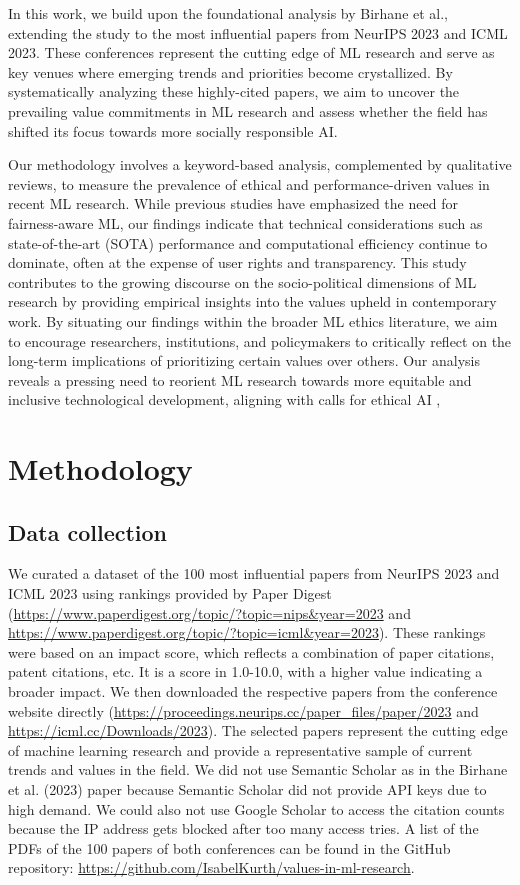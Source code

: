 \documentclass{article}
\begin{document}
In this work, we build upon the foundational analysis by Birhane et al., extending the study to the most influential papers from NeurIPS 2023 and ICML 2023. 
These conferences represent the cutting edge of ML research and serve as key venues where emerging trends and priorities become crystallized. By systematically analyzing these highly-cited papers, 
we aim to uncover the prevailing value commitments in ML research and assess whether the field has shifted its focus towards more socially responsible AI.

Our methodology involves a keyword-based analysis, complemented by qualitative reviews, to measure the prevalence of ethical and performance-driven values in recent ML research. While previous studies \cite{geyik2019fairness} 
have emphasized the need for fairness-aware ML, our findings indicate that technical considerations such as state-of-the-art (SOTA) performance and computational
efficiency continue to dominate, often at the expense of user rights and transparency.
This study contributes to the growing discourse on the socio-political dimensions of ML research by providing empirical insights into the values upheld in contemporary work. By situating our findings within 
the broader ML ethics literature, we aim to encourage researchers, institutions, and policymakers to critically reflect on the long-term implications of prioritizing 
certain values over others. Our analysis reveals a pressing need to reorient ML research towards more equitable and inclusive technological development, aligning with calls for ethical AI \cite{floridi2022unified}, \cite{kalluri2020don}

\section{Methodology}
\subsection{Data collection}
We curated a dataset of the 100 most influential papers from NeurIPS 2023 and ICML 2023 using rankings provided by Paper Digest 
(\url{https://www.paperdigest.org/topic/?topic=nips&year=2023} and \url{https://www.paperdigest.org/topic/?topic=icml&year=2023}). 
These rankings were based on an impact score, which reflects a combination of paper citations, patent citations, etc. It is a score in 1.0-10.0, 
with a higher value indicating a broader impact. We then downloaded the respective papers from the conference website directly 
(\url{https://proceedings.neurips.cc/paper_files/paper/2023} and \url{https://icml.cc/Downloads/2023}). 
The selected papers represent the cutting edge of machine 
learning research and provide a representative sample of current trends and values in the field. We did not use Semantic Scholar as in the Birhane et 
al. (2023) paper because Semantic Scholar did not provide API keys due to high demand. We could also not use Google Scholar to access the citation 
counts because the IP address gets blocked after too many access tries. A list of the PDFs of the 100 papers of both conferences can be found in the 
GitHub repository: \url{https://github.com/IsabelKurth/values-in-ml-research}.
\end{document}
